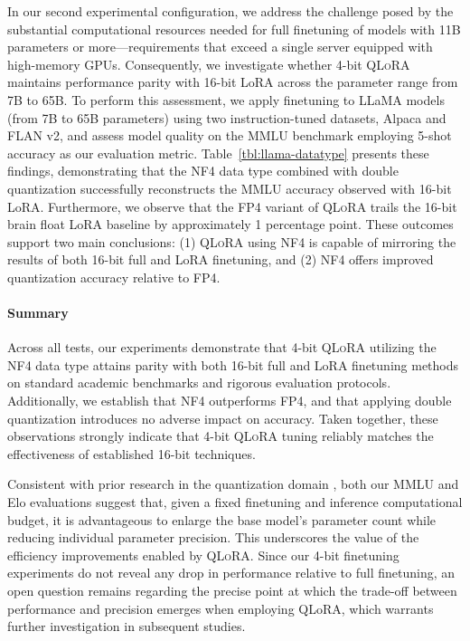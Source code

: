In our second experimental configuration, we address the challenge posed by the substantial computational resources needed for full finetuning of models with 11B parameters or more—requirements that exceed a single server equipped with high-memory GPUs. Consequently, we investigate whether 4-bit \textsc{QLoRA} maintains performance parity with 16-bit LoRA across the parameter range from 7B to 65B. To perform this assessment, we apply finetuning to LLaMA models (from 7B to 65B parameters) using two instruction-tuned datasets, Alpaca and FLAN v2, and assess model quality on the MMLU benchmark employing 5-shot accuracy as our evaluation metric. Table~\ref{tbl:llama-datatype} presents these findings, demonstrating that the NF4 data type combined with double quantization successfully reconstructs the MMLU accuracy observed with 16-bit LoRA. Furthermore, we observe that the FP4 variant of \textsc{QLoRA} trails the 16-bit brain float LoRA baseline by approximately 1 percentage point. These outcomes support two main conclusions: (1) \textsc{QLoRA} using NF4 is capable of mirroring the results of both 16-bit full and LoRA finetuning, and (2) NF4 offers improved quantization accuracy relative to FP4.

\paragraph{Summary} Across all tests, our experiments demonstrate that 4-bit \textsc{QLoRA} utilizing the NF4 data type attains parity with both 16-bit full and LoRA finetuning methods on standard academic benchmarks and rigorous evaluation protocols. Additionally, we establish that NF4 outperforms FP4, and that applying double quantization introduces no adverse impact on accuracy. Taken together, these observations strongly indicate that 4-bit \textsc{QLoRA} tuning reliably matches the effectiveness of established 16-bit techniques.

Consistent with prior research in the quantization domain \citep{dettmers2022case}, both our MMLU and Elo evaluations suggest that, given a fixed finetuning and inference computational budget, it is advantageous to enlarge the base model’s parameter count while reducing individual parameter precision. This underscores the value of the efficiency improvements enabled by \textsc{QLoRA}. Since our 4-bit finetuning experiments do not reveal any drop in performance relative to full finetuning, an open question remains regarding the precise point at which the trade-off between performance and precision emerges when employing QLoRA, which warrants further investigation in subsequent studies.

